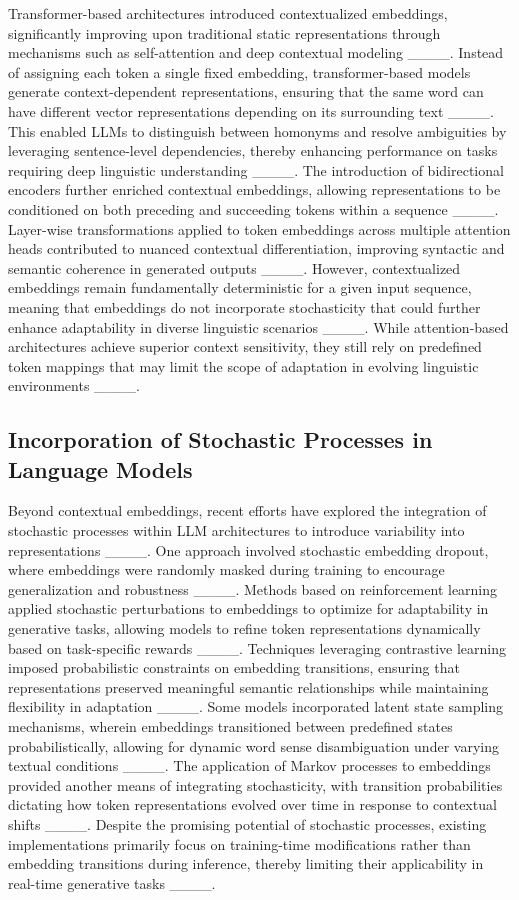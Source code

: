Transformer-based architectures introduced contextualized embeddings, significantly improving upon traditional static representations through mechanisms such as self-attention and deep contextual modeling ____. Instead of assigning each token a single fixed embedding, transformer-based models generate context-dependent representations, ensuring that the same word can have different vector representations depending on its surrounding text ____. This enabled LLMs to distinguish between homonyms and resolve ambiguities by leveraging sentence-level dependencies, thereby enhancing performance on tasks requiring deep linguistic understanding ____. The introduction of bidirectional encoders further enriched contextual embeddings, allowing representations to be conditioned on both preceding and succeeding tokens within a sequence ____. Layer-wise transformations applied to token embeddings across multiple attention heads contributed to nuanced contextual differentiation, improving syntactic and semantic coherence in generated outputs ____. However, contextualized embeddings remain fundamentally deterministic for a given input sequence, meaning that embeddings do not incorporate stochasticity that could further enhance adaptability in diverse linguistic scenarios ____. While attention-based architectures achieve superior context sensitivity, they still rely on predefined token mappings that may limit the scope of adaptation in evolving linguistic environments ____.

\subsection{Incorporation of Stochastic Processes in Language Models}

Beyond contextual embeddings, recent efforts have explored the integration of stochastic processes within LLM architectures to introduce variability into representations ____. One approach involved stochastic embedding dropout, where embeddings were randomly masked during training to encourage generalization and robustness ____. Methods based on reinforcement learning applied stochastic perturbations to embeddings to optimize for adaptability in generative tasks, allowing models to refine token representations dynamically based on task-specific rewards ____. Techniques leveraging contrastive learning imposed probabilistic constraints on embedding transitions, ensuring that representations preserved meaningful semantic relationships while maintaining flexibility in adaptation ____. Some models incorporated latent state sampling mechanisms, wherein embeddings transitioned between predefined states probabilistically, allowing for dynamic word sense disambiguation under varying textual conditions ____. The application of Markov processes to embeddings provided another means of integrating stochasticity, with transition probabilities dictating how token representations evolved over time in response to contextual shifts ____. Despite the promising potential of stochastic processes, existing implementations primarily focus on training-time modifications rather than embedding transitions during inference, thereby limiting their applicability in real-time generative tasks ____.